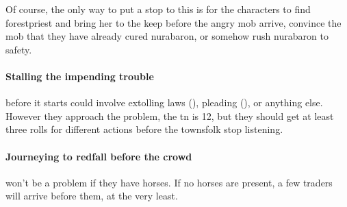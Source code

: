 Of course, the only way to put a stop to this is for the characters to find \gls{forestpriest} and bring her to the keep before the angry mob arrive, convince the mob that they have already cured \gls{nurabaron}, or somehow rush \gls{nurabaron} to safety.

\paragraph{Stalling the impending trouble}
before it starts could involve extolling laws (), pleading (), or anything else.
However they approach the problem, the \gls{tn} is 12, but they should get at least three rolls for different actions before the townsfolk stop listening.

\paragraph{Journeying to \gls{redfall} before the crowd}
won't be a problem if they have horses.
If no horses are present, a few traders will arrive before them, at the very least.

